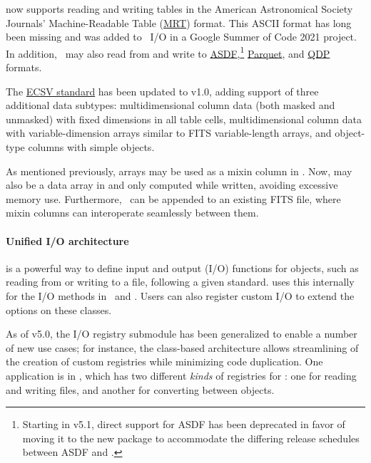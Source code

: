 \documentclass[modern]{aastex631}
\begin{document}
\astropy now supports reading and writing tables in the American Astronomical
Society Journals' Machine-Readable Table (\href{https://docs.astropy.org/en/stable/io/ascii/write.html#cds-mrt-format}{MRT}) format. This ASCII format has
long been missing and was added to \astropyTable\ I/O in a Google Summer of Code 2021 project.
In addition, \astropyTable\ may also read from and write
to \href{https://asdf-standard.readthedocs.io/en/latest/}{ASDF},\footnote{Starting in v5.1,
direct \astropypkg support for ASDF has been deprecated in favor of moving it
to the new  \citep{asdf-astropy} package to accommodate
the differing release schedules between ASDF and \astropypkg.}
\href{https://docs.astropy.org/en/stable/io/unified.html#table-io-parquet}{Parquet},
and \href{https://wwwastro.msfc.nasa.gov/qdp/}{QDP} formats.

The \href{https://github.com/astropy/astropy-APEs/blob/main/APE6.rst}{ECSV
standard} has been updated to v1.0, adding support of three additional data
subtypes: multidimensional column data (both masked and unmasked)
with fixed dimensions in all table cells, multidimensional
column data with variable-dimension arrays similar to FITS variable-length
arrays, and object-type columns with simple \python objects.

As mentioned previously,  arrays may be used as a mixin column in
\astropyTable. Now,  may also be a data array in
 and only
computed while written, avoiding excessive memory use. Furthermore, \astropyTable\ can
be appended to an existing FITS file, where  mixin columns can
interoperate seamlessly between them.

\paragraph{Unified I/O architecture}

 is a powerful way to define input and output (I/O)
functions for \astropypkg objects, such as reading from or writing to a file,
following a given standard. \astropypkg uses this internally for the I/O methods in
\astropyTable\ and \astropyCosmology. Users can also register custom I/O to
extend the options on these classes.

As of \astropypkg v5.0, the I/O registry submodule has been generalized to enable a
number of new use cases; for instance, the class-based architecture allows
streamlining of the creation of custom registries while minimizing code duplication.
One application is in \astropycosmology,
which has two different \textit{kinds} of registries for \astropyCosmology: one
for reading and writing files, and another for converting between \python objects.
\end{document}
